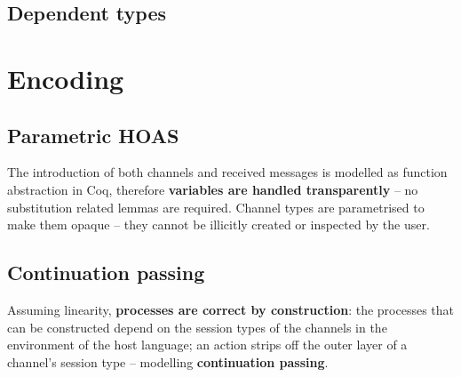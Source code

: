 \documentclass{mproj}
\begin{document}
\cite{Wadler1989}

\section{Dependent types}\label{dependent-types}

\chapter{Encoding}\label{encoding}

\section{Parametric HOAS}\label{phoas}

\cite{Wadler1989}
\cite{Chlipala2008}

The introduction of both channels and received messages is modelled as function
abstraction in Coq, therefore \textbf{variables are handled transparently} -- no
substitution related lemmas are required. Channel types are parametrised to make
them opaque -- they cannot be illicitly created or inspected by the user.

\section{Continuation passing}\label{continuation-passing}

\cite{Vasconcelos2010}

Assuming linearity, \textbf{processes are correct by construction}: the
processes that can be constructed depend on the session types of the channels in
the environment of the host language; an action strips off the outer layer of a
channel's session type -- modelling \textbf{continuation passing}.
\end{document}
